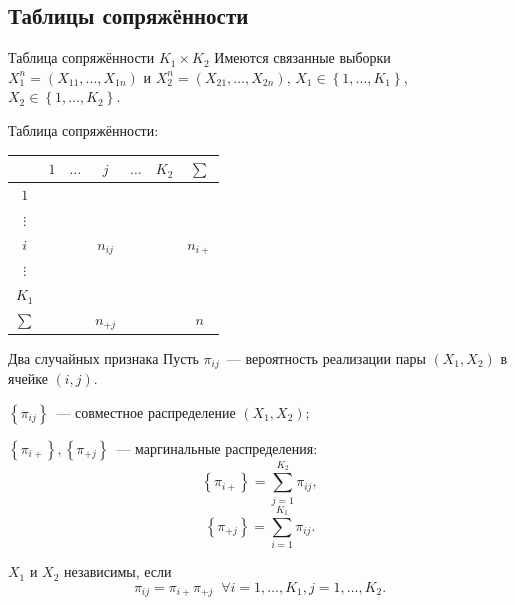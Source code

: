 \documentclass[9pt,pdf,utf8,hyperref={unicode},aspectratio=169]{beamer}
\begin{document}
\subsection{Таблицы сопряжённости}
\begin{frame}{Таблица сопряжённости $K_1 \times K_2$}
	Имеются связанные выборки $X_1^n = \left(X_{11},\ldots,X_{1n}\right)$ и $X_2^n = \left(X_{21},\ldots,X_{2n}\right)$, $X_{1} \in \left\{1,\dots,K_1\right\}$, $X_{2} \in \left\{1,\dots,K_2\right\}.$
	
	\bigskip
	
	Таблица сопряжённости:
	
	\begin{center}
		\begin{tabular}{|c|c|c|c|c|c|c|}
			\hline
			\diagbox{$X_1$}{$X_2$} & $1$ & $\ldots$ & $j$             & $\ldots$ & $K_2$ & $\sum$\\ \hline
			$1$                         &     &          &                 &          &       &   \\ \hline
			$\vdots$                    &     &          &                 &          &       &\\ \hline
			$i$                         &     &          & $n_{ij}$        &          &       &$n_{i+}$\\ \hline
			$\vdots$                    &     &          &                 &          &       &\\ \hline
			$K_1$                       &     &          &                 &          &       &\\ \hline
			$\sum$                      &     &          & $n_{+j}$        &          &       & $n$ \\ \hline
		\end{tabular}
	\end{center}
\end{frame}

\begin{frame}{Два случайных признака}
	Пусть $\pi_{ij}$~--- вероятность реализации пары $\left(X_{1},X_{2}\right)$ в ячейке $\left(i,j\right).$
	
	$\left\{\pi_{ij}\right\}$~--- совместное распределение $\left(X_{1},X_{2}\right);$
	
	$\left\{\pi_{i+}\right\}, \left\{\pi_{+j}\right\}$~--- маргинальные распределения:
    $$
    \left\{\pi_{i+}\right\} = \sum_{j=1}^{K_2}\pi_{ij},  
    $$
    $$
    \left\{\pi_{+j}\right\} = \sum_{i=1}^{K_1}\pi_{ij}.
    $$
	
	\bigskip
	
	$X_1$ и $X_2$ независимы, если
	$$\pi_{ij} = \pi_{i+}\pi_{+j} \;\; \forall i=1,\dots,K_1, j=1,\dots,K_2.$$
\end{frame}
\end{document}

